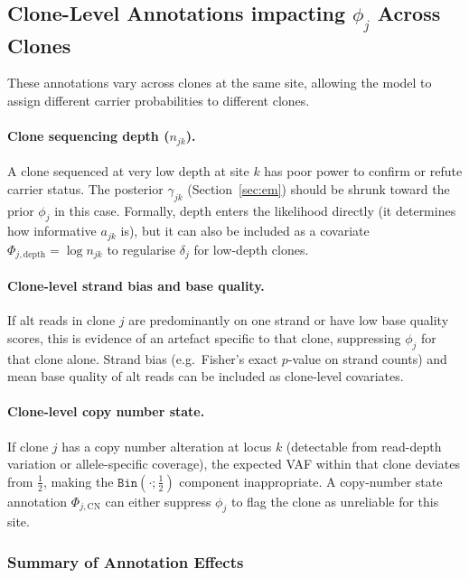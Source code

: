 \documentclass{article}
\begin{document}
\subsection*{Clone-Level Annotations impacting $\phi_j$ Across Clones}

These annotations vary across clones at the same site, allowing the model to
assign different carrier probabilities to different clones.

\paragraph{Clone sequencing depth ($n_{jk}$).}
A clone sequenced at very low depth at site $k$ has poor power to confirm or
refute carrier status.  The posterior $\gamma_{jk}$ (Section~\ref{sec:em})
should be shrunk toward the prior $\phi_j$ in this case.  Formally, depth
enters the likelihood directly (it determines how informative $a_{jk}$ is), but
it can also be included as a covariate $\Phi_{j,\mathrm{depth}} = \log n_{jk}$
to regularise $\delta_j$ for low-depth clones.

\paragraph{Clone-level strand bias and base quality.}
If alt reads in clone $j$ are predominantly on one strand or have low base
quality scores, this is evidence of an artefact specific to that clone,
suppressing $\phi_j$ for that clone alone.  Strand bias (e.g.\ Fisher's
exact $p$-value on strand counts) and mean base quality of alt reads can be
included as clone-level covariates.

\paragraph{Clone-level copy number state.}
If clone $j$ has a copy number alteration at locus $k$ (detectable from
read-depth variation or allele-specific coverage), the expected VAF within that
clone deviates from $\tfrac{1}{2}$, making the $\texttt{Bin}(\cdot;
\tfrac{1}{2})$ component inappropriate.  A copy-number state annotation
$\Phi_{j,\mathrm{CN}}$ can either suppress $\phi_j$ to flag the clone
as unreliable for this site.

\subsubsection*{Summary of Annotation Effects}
\end{document}
